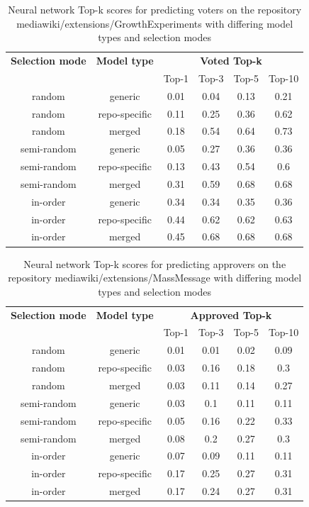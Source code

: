 \begin{table}[H]
    \centering
    \begin{tabular}{@{}c c c c c c@{}} 
 \hline
    \textbf{Selection mode} & \textbf{Model type} &
    \multicolumn{4}{c}{\textbf{Voted Top-k}} \\
      & & {Top-1} & {Top-3} & {Top-5} & {Top-10} \\
\hline
random & generic & 0.01 & 0.04 & 0.13 & 0.21 \\
random & repo-specific & 0.11 & 0.25 & 0.36 & 0.62 \\
random & merged & 0.18 & 0.54 & 0.64 & 0.73 \\
\hline
semi-random & generic & 0.05 & 0.27 & 0.36 & 0.36 \\
semi-random & repo-specific & 0.13 & 0.43 & 0.54 & 0.6 \\
semi-random & merged & 0.31 & 0.59 & 0.68 & 0.68 \\
\hline
in-order & generic & 0.34 & 0.34 & 0.35 & 0.36 \\
in-order & repo-specific & 0.44 & 0.62 & 0.62 & 0.63 \\
in-order & merged & 0.45 & 0.68 & 0.68 & 0.68 \\
\hline
\end{tabular}
    \caption{Neural network Top-k scores for predicting voters on the repository mediawiki/extensions/GrowthExperiments with differing model types and selection modes}
    \label{table:top-k-results-growth-experiements-over-combinations-voted}
\end{table}

\begin{table}[H]
    \centering
    \begin{tabular}{@{}c c c c c c@{}} 
 \hline
    \textbf{Selection mode} & \textbf{Model type} &
    \multicolumn{4}{c}{\textbf{Approved Top-k}} \\
      & & {Top-1} & {Top-3} & {Top-5} & {Top-10} \\
\hline
random & generic & 0.01 & 0.01 & 0.02 & 0.09 \\
random & repo-specific & 0.03 & 0.16 & 0.18 & 0.3 \\
random & merged & 0.03 & 0.11 & 0.14 & 0.27 \\
\hline
semi-random & generic & 0.03 & 0.1 & 0.11 & 0.11 \\
semi-random & repo-specific & 0.05 & 0.16 & 0.22 & 0.33 \\
semi-random & merged & 0.08 & 0.2 & 0.27 & 0.3 \\
\hline
in-order & generic & 0.07 & 0.09 & 0.11 & 0.11 \\
in-order & repo-specific & 0.17 & 0.25 & 0.27 & 0.31 \\
in-order & merged & 0.17 & 0.24 & 0.27 & 0.31 \\
\hline
\end{tabular}
    \caption{Neural network Top-k scores for predicting approvers on the repository mediawiki/extensions/MassMessage with differing model types and selection modes}
    \label{table:top-k-results-mass-message-over-combinations-approved}
\end{table}


